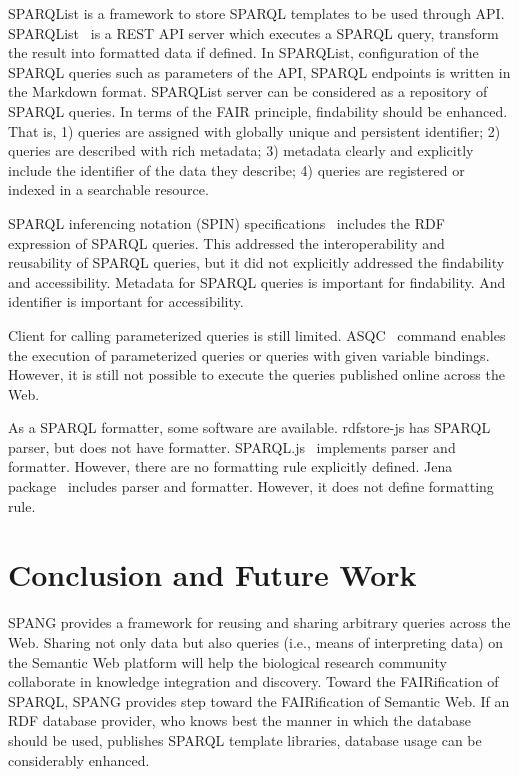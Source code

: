 \documentclass[runningheads]{llncs}
\begin{document}
SPARQList is a framework to store SPARQL templates to be used through API. SPARQList~\cite{sparqlist} is a REST API server which executes a SPARQL query, transform the result into formatted data if defined. In SPARQList, configuration of the SPARQL queries such as parameters of the API, SPARQL endpoints is written in the Markdown format. SPARQList server can be considered as a repository of SPARQL queries. In terms of the FAIR principle, findability should be enhanced. That is, 1) queries are assigned with globally unique and persistent identifier; 2) queries are described with rich metadata; 3) metadata clearly and explicitly include the identifier of the data they describe; 4) queries are registered or indexed in a searchable resource.

SPARQL inferencing notation (SPIN) specifications~\cite{spin} includes the RDF expression of SPARQL queries. This addressed the interoperability and reusability of SPARQL queries, but it did not explicitly addressed the findability and accessibility. Metadata for SPARQL queries is important for findability. And identifier is important for accessibility.

Client for calling parameterized queries is still limited.
ASQC~\cite{asqc} command enables the execution of parameterized queries or queries with given variable bindings. However, it is still not possible to execute the queries published online across the Web.

As a SPARQL formatter, some software are available.
rdfstore-js\cite{rdfstore-js} has SPARQL parser, but does not have formatter.
SPARQL.js~\cite{sparql-js} implements parser and formatter. However, there are no formatting rule explicitly defined.
Jena package~\cite{jena} includes parser and formatter. However, it does not define formatting rule.



\section{Conclusion and Future Work}

SPANG provides a framework for reusing and sharing arbitrary queries across the Web.
Sharing not only data but also queries (i.e., means of interpreting data) on the Semantic Web platform will help the biological research community collaborate in knowledge integration and discovery.
Toward the FAIRification of SPARQL, SPANG provides step toward the FAIRification of Semantic Web. 
If an RDF database provider,
who knows best the manner in which the database should be used,
publishes SPARQL template libraries, database usage can be considerably enhanced.
\end{document}
